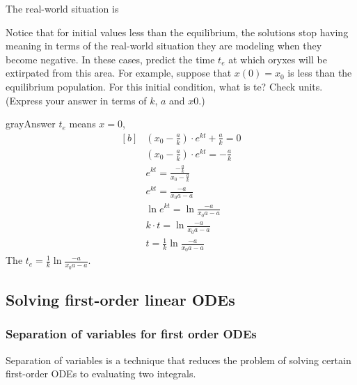 \begin{problem}
  The real-world situation is   
\end{problem}
Notice that for initial values less than the equilibrium,
the solutions stop having meaning in terms of the real-world situation they are modeling when they become negative.
In these cases, predict the time $t_e$ at which oryxes will be extirpated from this area.
For example, suppose that $x(0) =x_0$ is less than the equilibrium population.
For this initial condition, what is te? Check units.\\
(Express your answer in terms of $k$, $a$ and $x0$.)
\begin{mybox}{gray}{Answer}
  $t_e$ means $x = 0$, 
  \begin{equation*}
    \begin{aligned}[b]
      &\displaystyle (x_0 - \frac{a}{k})\cdot e^{kt} + \frac{a}{k} = 0 \\
      &\displaystyle (x_0 - \frac{a}{k})\cdot e^{kt} = -\frac{a}{k} \\
      &\displaystyle e^{kt} = \frac{-\frac{a}{k}}{x_0 - \frac{a}{k}} \\
      &\displaystyle e^{kt} = \frac{-a}{x_0 a - a} \\
      &\displaystyle \ln {e^{kt}} = \ln { \frac{-a}{x_0 a - a} } \\
      &\displaystyle k\cdot t =  \ln { \frac{-a}{x_0 a - a} }\\
      &\displaystyle t = \frac{1}{k} \ln { \frac{-a}{x_0 a - a} }
    \end{aligned}
  \end{equation*}
  The $\displaystyle t_e = \frac{1}{k} \ln { \frac{-a}{x_0 a - a} }$.  
\end{mybox}
\clearpage

\subsection{Solving first-order linear ODEs}
\subsubsection{Separation of variables for first order ODEs}
{\color{blue}Separation of variables} is a technique that reduces the problem of solving
certain first-order ODEs to evaluating two integrals.\\

